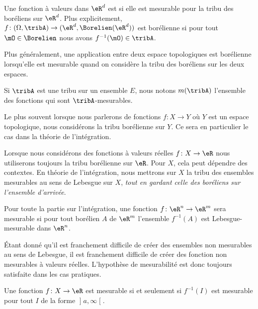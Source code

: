 \begin{definition}     \label{DefHHIBooNrpQjs}
    Une fonction à valeurs dans \( \eR^d\) est  si elle est mesurable pour la tribu des boréliens sur \( \eR^d\). Plus explicitement, \( f\colon (\Omega,\tribA)\to (\eR^d,\Borelien(\eR^d))\) est borélienne si pour tout \( \mO\in\Borelien\) nous avons \( f^{-1}(\mO)\in\tribA\).

    Plus généralement, une application entre deux espace topologiques est borélienne lorsqu'elle est mesurable quand on considère la tribu des boréliens sur les deux espaces.
\end{definition}
Si \( \tribA\) est une tribu sur un ensemble \( E\), nous notons \( m(\tribA)\) l'ensemble des fonctions qui sont \( \tribA\)-mesurables.

Le plus souvent lorsque nous parlerons de fonctions \( f\colon X\to Y\) où \( Y\) est un espace topologique, nous considérons la tribu borélienne sur \( Y\). Ce sera en particulier le cas dans la théorie de l'intégration.

\begin{remark}
    Lorsque nous considérons des fonctions à valeurs réelles \( f\colon X\to \eR\) nous utiliserons toujours la tribu borélienne sur \( \eR\). Pour \( X\), cela peut dépendre des contextes. En théorie de l'intégration, nous mettrons sur \( X\) la tribu des ensembles mesurables au sens de Lebesgue sur \( X\), \emph{tout en gardant celle des boréliens sur l'ensemble d'arrivée}.

    Pour toute la partie sur l'intégration, une fonction \( f\colon \eR^n\to \eR^m\) sera mesurable si pour tout borélien \( A\) de \( \eR^m\) l'ensemble \( f^{-1}(A)\) est Lebesgue-mesurable dans \( \eR^n\).

    Étant donné qu'il est franchement difficile de créer des ensembles non mesurables au sens de Lebesgue, il est franchement difficile de créer des fonction non mesurables à valeurs réelles. L'hypothèse de mesurabilité est donc toujours satisfaite dans les cas pratiques.
\end{remark}

\begin{lemma}   \label{LemFOlheqw}
    Une fonction \( f\colon X\to \eR\) est mesurable si et seulement si \( f^{-1}(I)\) est mesurable pour tout \( I\) de la forme \( \mathopen] a , \infty \mathclose[\).
\end{lemma}

